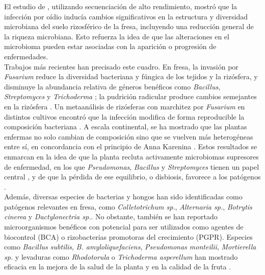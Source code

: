 El estudio de \citet{yang2020comparison}, utilizando secuenciación de alto rendimiento, 
mostró que la infección por oídio inducía cambios significativos en la estructura y 
diversidad microbiana del suelo rizosférico de la fresa, incluyendo una reducción 
general de la riqueza microbiana. Esto refuerza la idea de que las alteraciones 
en el microbioma pueden estar asociadas con la aparición o progresión de enfermedades. \\

Trabajos más recientes han precisado este cuadro. En fresa, la invasión por \textit{Fusarium}
reduce la diversidad bacteriana y fúngica de los tejidos y la rizósfera, y disminuye la abundancia
relativa de géneros benéficos como \textit{Bacillus}, \textit{Streptomyces} y \textit{Trichoderma}
\citep{yang2023fusarium}; la pudrición radicular produce cambios semejantes en la rizósfera
\citep{zhang2023rhizosphere}. Un metaanálisis de rizósferas con marchitez por \textit{Fusarium} en
distintos cultivos encontró que la infección modifica de forma reproducible la composición
bacteriana \citep{su2025general}. A escala continental, se ha mostrado que las plantas enfermas no
solo cambian de composición sino que se vuelven más heterogéneas entre sí, en concordancia con el
principio de Anna Karenina \citep{li2026anna}. Estos resultados se enmarcan en la idea de que la
planta recluta activamente microbiomas supresores de enfermedad, en los que \textit{Pseudomonas},
\textit{Bacillus} y \textit{Streptomyces} tienen un papel central \citep{spooren2024plant}, y de que la
pérdida de ese equilibrio, o disbiosis, favorece a los patógenos \citep{du2024microbiome}. \\

Además, diversas especies de bacterias y hongos han sido identificadas como patógenos
relevantes en fresa, como \textit{Colletotrichum sp.}, \textit{Alternaria sp.}, \textit{Botrytis cinerea}
y \textit{Dactylonectria sp.}. No obstante, también se han reportado microorganismos benéficos
con potencial para ser utilizados como agentes de biocontrol (BCA) o
rizobacterias promotoras del crecimiento (PGPR). Especies como \textit{Bacillus subtilis},
 \textit{B. amyloliquefaciens}, \textit{Pseudomonas monteilii}, \textit{Mortierella sp.} y levaduras
 como \textit{Rhodotorula} o \textit{Trichoderma asperellum} han mostrado eficacia en la mejora
 de la salud de la planta y en la calidad de la 
 fruta \citep{nam2023multidisciplinary, siegieda2024ecological, drobek2021use}. \\


